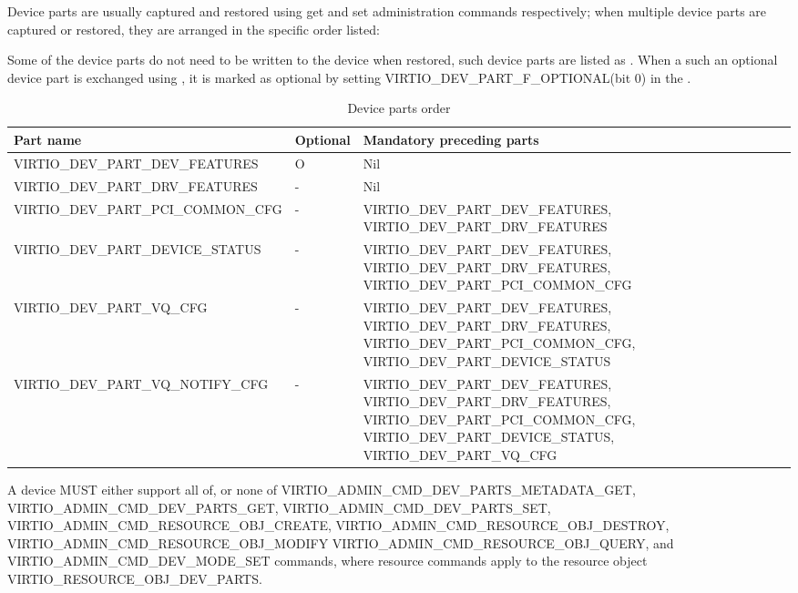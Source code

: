 Device parts are usually captured and restored using get and set administration
commands respectively; when multiple device parts are captured or restored,
they are arranged in the specific order listed:

Some of the device parts do not need to be written to the device when restored, such
device parts are listed as . When a such an optional device part is
exchanged using , it is marked as optional by
setting VIRTIO_DEV_PART_F_OPTIONAL(bit 0) in the .

\begin{table}[H]
\caption{Device parts order}
\label{table:Basic Facilities of a Virtio Device / Device groups / Group administration commands / Device parts / Device parts order/ Device parts order}
\begin{tabularx}{\textwidth}{ |l|l|X| }
\hline
Part name & Optional & Mandatory preceding parts \\
\hline \hline
\hline
VIRTIO_DEV_PART_DEV_FEATURES & O & Nil \\
\hline
VIRTIO_DEV_PART_DRV_FEATURES & - & Nil \\
\hline
VIRTIO_DEV_PART_PCI_COMMON_CFG & - & VIRTIO_DEV_PART_DEV_FEATURES, VIRTIO_DEV_PART_DRV_FEATURES \\
\hline
VIRTIO_DEV_PART_DEVICE_STATUS & - & VIRTIO_DEV_PART_DEV_FEATURES, VIRTIO_DEV_PART_DRV_FEATURES, VIRTIO_DEV_PART_PCI_COMMON_CFG \\
\hline
VIRTIO_DEV_PART_VQ_CFG & - & VIRTIO_DEV_PART_DEV_FEATURES, VIRTIO_DEV_PART_DRV_FEATURES, VIRTIO_DEV_PART_PCI_COMMON_CFG,
                             VIRTIO_DEV_PART_DEVICE_STATUS \\
\hline
VIRTIO_DEV_PART_VQ_NOTIFY_CFG & - & VIRTIO_DEV_PART_DEV_FEATURES, VIRTIO_DEV_PART_DRV_FEATURES, VIRTIO_DEV_PART_PCI_COMMON_CFG,
                             VIRTIO_DEV_PART_DEVICE_STATUS, VIRTIO_DEV_PART_VQ_CFG \\
\hline
\hline
\end{tabularx}
\end{table}


A device MUST either support all of, or none of
VIRTIO_ADMIN_CMD_DEV_PARTS_METADATA_GET,
VIRTIO_ADMIN_CMD_DEV_PARTS_GET, VIRTIO_ADMIN_CMD_DEV_PARTS_SET,
VIRTIO_ADMIN_CMD_RESOURCE_OBJ_CREATE,
VIRTIO_ADMIN_CMD_RESOURCE_OBJ_DESTROY, VIRTIO_ADMIN_CMD_RESOURCE_OBJ_MODIFY
VIRTIO_ADMIN_CMD_RESOURCE_OBJ_QUERY, and
VIRTIO_ADMIN_CMD_DEV_MODE_SET commands, where resource commands apply to
the resource object VIRTIO_RESOURCE_OBJ_DEV_PARTS.

